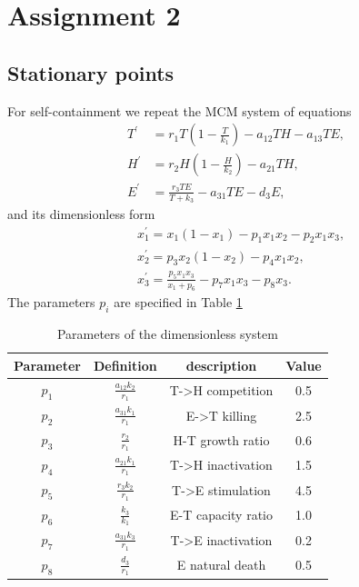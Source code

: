 \section{Assignment 2}

\subsection{Stationary points}
For self-containment we repeat the MCM system of equations
\begin{align*}
    T^{\prime} & =r_1 T\left(1-\frac{T}{k_1}\right)-a_{12} T H-a_{13} T E, \\
    H^{\prime} & =r_2 H\left(1-\frac{H}{k_2}\right)-a_{21} T H, \\
    E^{\prime} & =\frac{r_3 T E}{T+k_3}-a_{31} T E-d_3 E ,
\end{align*}
and its dimensionless form
\begin{align*}
    & x_1^{\prime}=x_1\left(1-x_1\right)-p_1 x_1 x_2-p_2 x_1 x_3, \\
    & x_2^{\prime}=p_3 x_2\left(1-x_2\right)-p_4 x_1 x_2, \\
    & x_3^{\prime}=\frac{p_5 x_1 x_3}{x_1+p_6}-p_7 x_1 x_3-p_8 x_3 .
\end{align*}
The parameters $p_i$ are specified in Table \ref{tab:mcm_parameters}
\begin{table}[H]
    \centering
    \begin{tabular}{|c|c|c|c|}
        \hline
        Parameter   & Definition                & description           & Value \\
        \hline
        $p_1$       & $\frac{a_{12}k_2}{r_1}$     & T->H competition      & 0.5 \\
        $p_2$       & $\frac{a_{31}k_1}{r_1}$     & E->T killing          & 2.5 \\
        $p_3$       & $\frac{r_2}{r_1}      $     & H-T growth ratio      & 0.6 \\
        $p_4$       & $\frac{a_{21}k_1}{r_1}$     & T->H inactivation     & 1.5 \\
        $p_5$       & $\frac{r_3k_2}{r_1}   $     & T->E stimulation      & 4.5 \\
        $p_6$       & $\frac{k_3}{k_1}      $     & E-T capacity ratio    & 1.0 \\
        $p_7$       & $\frac{a_{31}k_3}{r_1}$     & T->E inactivation     & 0.2 \\
        $p_8$       & $\frac{d_3}{r_1}      $     & E natural death       & 0.5 \\
        \hline
    \end{tabular}
    \caption{Parameters of the dimensionless system}
    \label{tab:mcm_parameters}
\end{table}

